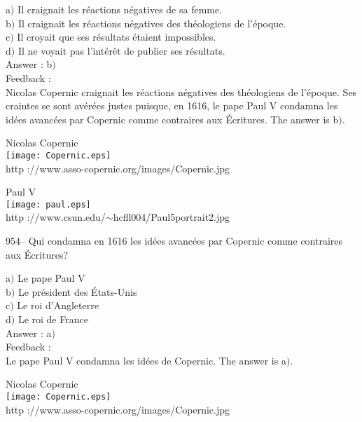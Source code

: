 \documentclass[letterpaper, 12pt]{article}
\begin{document}
a$)$ Il craignait les r\'eactions n\'egatives de sa femme. \\
b$)$ Il craignait les r\'eactions n\'egatives des th\'eologiens de
l'\'epoque. \\
c$)$ Il croyait que ses r\'esultats \'etaient impossibles.  \\
d$)$ Il ne voyait pas l'int\'er\^et de publier ses r\'esultats. \\

Answer : b$)$\\

Feedback : \\
Nicolas Copernic craignait les r\'eactions n\'egatives des
th\'eologiens de l'\'epoque. Ses craintes se sont av\'er\'ees justes
puisque, en 1616, le pape Paul V condamna les id\'ees avanc\'ees par
Copernic comme \og contraires aux \'Ecritures\fg . The answer is b$)$.\\

        \begin{center}
        Nicolas Copernic\\
    \texttt{[image: Copernic.eps]}\\
        {\footnotesize http ://www.asso-copernic.org/images/Copernic.jpg}
    \end{center}

        \begin{center}
        Paul V\\
    \texttt{[image: paul.eps]}\\
        {\footnotesize http
://www.csun.edu/$\sim$hcfll004/Paul5portrait2.jpg}
    \end{center}

954-- Qui condamna en 1616 les id\'ees avanc\'ees par Copernic comme
\og contraires aux \'Ecritures\fg ?

a$)$ Le pape Paul V \\
b$)$ Le pr\'esident des \'Etats-Unis \\
c$)$ Le roi d'Angleterre  \\
d$)$ Le roi de France\\

Answer : a$)$\\

Feedback : \\
Le pape Paul V condamna les id\'ees de Copernic. The answer is a$)$.\\

        \begin{center}
        Nicolas Copernic\\
    \texttt{[image: Copernic.eps]}\\
        {\footnotesize http ://www.asso-copernic.org/images/Copernic.jpg}
    \end{center}
\end{document}
